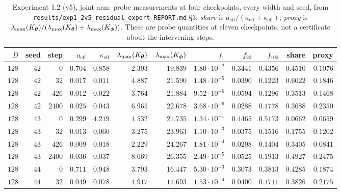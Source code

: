 \begin{table}[htbp]
\centering
\footnotesize
\setlength{\tabcolsep}{2.5pt}
\caption{Experiment 1.2 (v5), joint arm: probe measurements at four
checkpoints, every width and seed, from
\texttt{results/exp1\_2v5\_residual\_export\_REPORT.md} \S3. \emph{share} is
$a_{\mathrm{eff}}/(a_{\mathrm{eff}}+\kappa_{\mathrm{eff}})$; \emph{proxy} is
$\lambda_{\max}(K_{\boldsymbol{\theta}})/(\lambda_{\max}(K_{\boldsymbol{\theta}})+\lambda_{\max}(K_{\boldsymbol{\phi}}))$.
These are probe quantities at eleven checkpoints, not a certificate about the
intervening steps.}
\label{tab:app_v5_head}
\begin{tabular}{rrrrrrrrrrrr}
\toprule
$D$ & seed & step & $a_{\mathrm{eff}}$ & $\kappa_{\mathrm{eff}}$ & $\lambda_{\max}(K_{\boldsymbol{\theta}})$ & $\lambda_{\max}(K_{\boldsymbol{\phi}})$ & $f_1$ & $f_{20}$ & $f_{100}$ & share & proxy \\
\midrule
$128$ & $42$ & $0$    & $0.704$ & $0.858$   & $2.393$  & $19.839$  & $1.80\cdot10^{-2}$ & $0.3441$ & $0.4356$ & $0.4510$ & $0.1076$ \\
$128$ & $42$ & $32$   & $0.017$ & $0.011$   & $4.887$  & $21.590$  & $1.48\cdot10^{-5}$ & $0.0390$ & $0.1223$ & $0.6022$ & $0.1846$ \\
$128$ & $42$ & $426$  & $0.012$ & $0.022$   & $3.764$  & $21.884$  & $9.52\cdot10^{-6}$ & $0.0594$ & $0.1296$ & $0.3513$ & $0.1468$ \\
$128$ & $42$ & $2400$ & $0.025$ & $0.043$   & $6.965$  & $22.678$  & $3.68\cdot10^{-6}$ & $0.0288$ & $0.1778$ & $0.3688$ & $0.2350$ \\
$128$ & $43$ & $0$    & $0.299$ & $4.219$   & $1.532$  & $21.735$  & $1.34\cdot10^{-1}$ & $0.4465$ & $0.5173$ & $0.0662$ & $0.0659$ \\
$128$ & $43$ & $32$   & $0.013$ & $0.060$   & $3.275$  & $23.963$  & $1.10\cdot10^{-3}$ & $0.0375$ & $0.1516$ & $0.1755$ & $0.1202$ \\
$128$ & $43$ & $426$  & $0.009$ & $0.018$   & $2.229$  & $24.267$  & $1.81\cdot10^{-4}$ & $0.0298$ & $0.1404$ & $0.3405$ & $0.0841$ \\
$128$ & $43$ & $2400$ & $0.036$ & $0.037$   & $8.669$  & $26.355$  & $2.49\cdot10^{-5}$ & $0.0525$ & $0.1913$ & $0.4927$ & $0.2475$ \\
$128$ & $44$ & $0$    & $0.711$ & $0.948$   & $3.793$  & $16.447$  & $5.30\cdot10^{-3}$ & $0.3073$ & $0.3813$ & $0.4285$ & $0.1874$ \\
$128$ & $44$ & $32$   & $0.049$ & $0.078$   & $4.917$  & $17.693$  & $1.53\cdot10^{-4}$ & $0.0400$ & $0.1711$ & $0.3826$ & $0.2175$ \\

\end{tabular}
\end{table}
